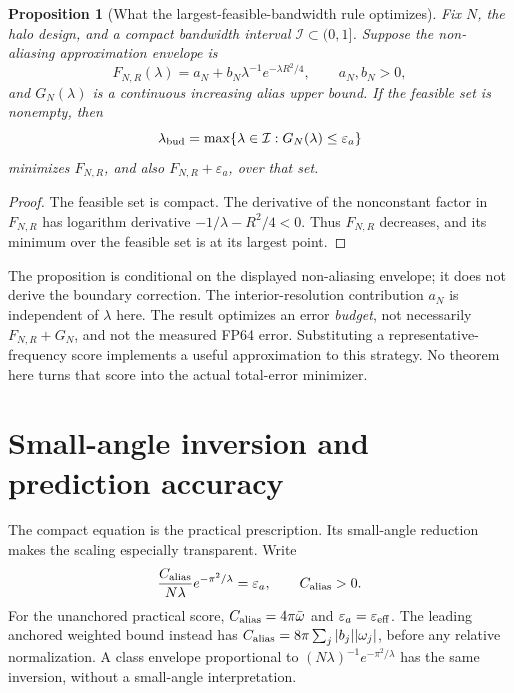 \documentclass[11pt]{article}
\newtheorem{proposition}[theorem]{Proposition}
\theoremstyle{definition}\newtheorem{definition}[theorem]{Definition}
\theoremstyle{remark}\newtheorem{remark}[theorem]{Remark}
\numberwithin{equation}{section}
\begin{document}
\begin{proposition}[What the largest-feasible-bandwidth rule optimizes]
\label{prop:budget}
Fix $N$, the halo design, and a compact bandwidth interval $\mathcal I\subset(0,1]$. Suppose the non-aliasing approximation envelope is
\begin{equation}
 F_{N,R}(\lambda)=a_N+b_N\lambda^{-1}e^{-\lambda R^2/4},
 \qquad a_N,b_N>0,
 \label{eq:nonalias}
\end{equation}
and $G_N(\lambda)$ is a continuous increasing alias upper bound. If the feasible set is nonempty, then
\begin{equation}
 \lambda_{\rm bud}=\max\{\lambda\in\mathcal I:G_N(\lambda)\le\varepsilon_a\}
 \label{eq:budget}
\end{equation}
minimizes $F_{N,R}$, and also $F_{N,R}+\varepsilon_a$, over that set.
\end{proposition}
\begin{proof}
The feasible set is compact. The derivative of the nonconstant factor in $F_{N,R}$ has logarithm derivative $-1/\lambda-R^2/4<0$. Thus $F_{N,R}$ decreases, and its minimum over the feasible set is at its largest point.
\end{proof}
The proposition is conditional on the displayed non-aliasing envelope; it does not derive the boundary correction. The interior-resolution contribution $a_N$ is independent of $\lambda$ here. The result optimizes an error \emph{budget}, not necessarily $F_{N,R}+G_N$, and not the measured FP64 error. Substituting a representative-frequency score implements a useful approximation to this strategy. No theorem here turns that score into the actual total-error minimizer.

\section{Small-angle inversion and prediction accuracy}
\label{sec:inversion}
The compact equation is the practical prescription. Its small-angle reduction makes the scaling especially transparent. Write
\begin{equation}
 \frac{C_{\rm alias}}{N\lambda}e^{-\pi^2/\lambda}=\varepsilon_a,
 \qquad C_{\rm alias}>0.
 \label{eq:scalar}
\end{equation}
For the unanchored practical score, $C_{\rm alias}=4\pi\bar\omega$ and $\varepsilon_a=\varepsilon_{\rm eff}$. The leading anchored weighted bound instead has $C_{\rm alias}=8\pi\sum_j|b_j||\omega_j|$, before any relative normalization. A class envelope proportional to $(N\lambda)^{-1}e^{-\pi^2/\lambda}$ has the same inversion, without a small-angle interpretation.
\end{document}
